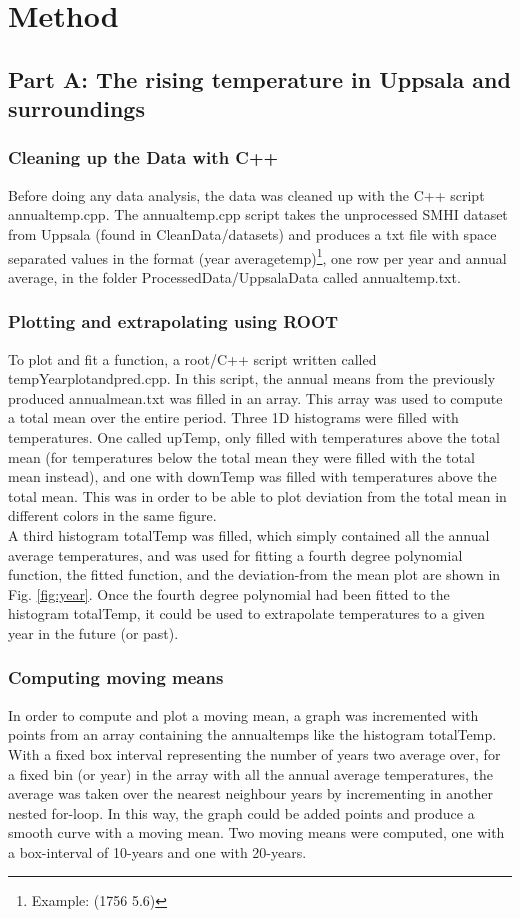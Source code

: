 \documentclass[a4paper]{article}
\begin{document}
\section{Method}\label{sec:method}

\subsection{Part A: The rising temperature in Uppsala and surroundings}
\subsubsection{Cleaning up the Data with C++}
Before doing any data analysis, the data was cleaned up with the C++ script annualtemp.cpp. The annualtemp.cpp script takes the unprocessed SMHI dataset from Uppsala (found in CleanData/datasets) and produces a txt file with space separated values in the format (year averagetemp)\footnote{Example: (1756 5.6)}, one row per year and annual average, in the folder ProcessedData/UppsalaData called annualtemp.txt. 

\subsubsection{Plotting and extrapolating using ROOT}
To plot and fit a function, a root/C++ script written called tempYearplotandpred.cpp. In this script, the annual means from the previously produced annualmean.txt was filled in an array. This array was used to compute a total mean over the entire period. Three 1D histograms were filled with
temperatures. One called upTemp, only filled with temperatures above the total mean (for temperatures below the total mean they were filled with the total mean instead), and one with downTemp was filled with temperatures above the total mean. This was in order to be able to plot deviation from the total mean in different colors in the same figure.\\

A third histogram totalTemp was filled, which simply contained all the annual average temperatures, and was used for fitting a fourth degree polynomial function, the fitted function, and the deviation-from the mean plot are shown in Fig. \ref{fig:year}. Once the fourth degree polynomial had been fitted to the histogram totalTemp, it could be used to extrapolate temperatures to a given year in the future (or past).

\subsubsection{Computing moving means}
In order to compute and plot a moving mean, a graph was incremented with points from an array containing the annualtemps like the histogram totalTemp. With a fixed box interval representing the number of years two average over, for a fixed bin (or year) in the array with all the annual average temperatures, the average was taken over the nearest neighbour years by incrementing in another nested for-loop. In this way, the graph could be added points and produce a smooth curve with a moving mean. Two moving means were computed, one with a box-interval of 10-years and one with 20-years.
\end{document}
